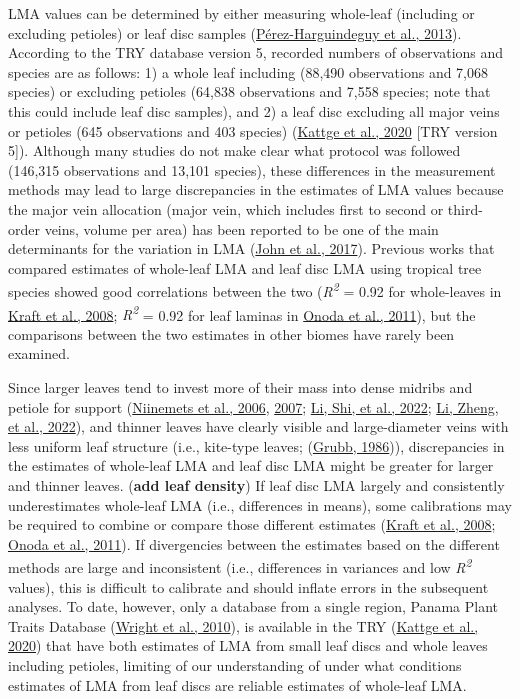 \documentclass[
  12pt,
  a4paper,
,tablecaptionabove
]{scrartcl}
\begin{document}
LMA values can be determined by either measuring whole-leaf (including or excluding petioles) or leaf disc samples (\protect\hyperlink{ref-Perez-Harguindeguy2013}{Pérez-Harguindeguy et al., 2013}).
According to the TRY database version 5, recorded numbers of observations and species are as follows:
1) a whole leaf including (88,490 observations and 7,068 species) or excluding petioles (64,838 observations and 7,558 species; note that this could include leaf disc samples), and
2) a leaf disc excluding all major veins or petioles (645 observations and 403 species) (\protect\hyperlink{ref-Kattge2020}{Kattge et al., 2020} {[}TRY version 5{]}).
Although many studies do not make clear what protocol was followed (146,315 observations and 13,101 species), these differences in the measurement methods may lead to large discrepancies in the estimates of LMA values because the major vein allocation (major vein, which includes first to second or third-order veins, volume per area) has been reported to be one of the main determinants for the variation in LMA (\protect\hyperlink{ref-John2017}{John et al., 2017}).
Previous works that compared estimates of whole-leaf LMA and leaf disc LMA using tropical tree species showed good correlations between the two (\emph{R\textsuperscript{2}} = 0.92 for whole-leaves in \protect\hyperlink{ref-Kraft2008}{Kraft et al., 2008}; \emph{R\textsuperscript{2}} = 0.92 for leaf laminas in \protect\hyperlink{ref-Onoda2011}{Onoda et al., 2011}), but the comparisons between the two estimates in other biomes have rarely been examined.

Since larger leaves tend to invest more of their mass into dense midribs and petiole for support (\protect\hyperlink{ref-Niinemets2006}{Niinemets et al., 2006}, \protect\hyperlink{ref-Niinemets2007}{2007}; \protect\hyperlink{ref-Li2022}{Li, Shi, et al., 2022}; \protect\hyperlink{ref-Li2022a}{Li, Zheng, et al., 2022}), and thinner leaves have clearly visible and large-diameter veins with less uniform leaf structure (i.e., kite-type leaves; (\protect\hyperlink{ref-Grubb1986}{Grubb, 1986})), discrepancies in the estimates of whole-leaf LMA and leaf disc LMA might be greater for larger and thinner leaves.
(\textbf{add leaf density})
If leaf disc LMA largely and consistently underestimates whole-leaf LMA (i.e., differences in means), some calibrations may be required to combine or compare those different estimates (\protect\hyperlink{ref-Kraft2008}{Kraft et al., 2008}; \protect\hyperlink{ref-Onoda2011}{Onoda et al., 2011}).
If divergencies between the estimates based on the different methods are large and inconsistent (i.e., differences in variances and low \emph{R\textsuperscript{2}} values), this is difficult to calibrate and should inflate errors in the subsequent analyses.
To date, however, only a database from a single region, Panama Plant Traits Database (\protect\hyperlink{ref-Wright2010}{Wright et al., 2010}), is available in the TRY (\protect\hyperlink{ref-Kattge2020}{Kattge et al., 2020}) that have both estimates of LMA from small leaf discs and whole leaves including petioles, limiting of our understanding of under what conditions estimates of LMA from leaf discs are reliable estimates of whole-leaf LMA.
\end{document}
